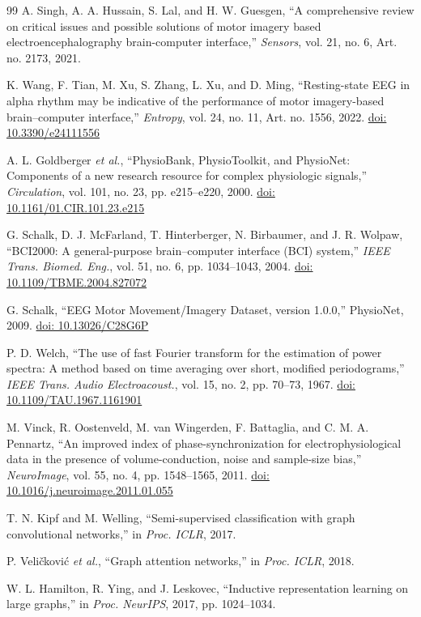 \documentclass{ieeeaccess}
\newcommand{\doiref}[1]{\href{https://doi.org/#1}{doi: #1}}
\begin{document}
\begin{thebibliography}{99}
 A. Singh, A. A. Hussain, S. Lal, and H. W. Guesgen, ``A comprehensive review on critical issues and possible solutions of motor imagery based electroencephalography brain-computer interface,'' \emph{Sensors}, vol. 21, no. 6, Art. no. 2173, 2021.

 K. Wang, F. Tian, M. Xu, S. Zhang, L. Xu, and D. Ming, ``Resting-state EEG in alpha rhythm may be indicative of the performance of motor imagery-based brain--computer interface,'' \emph{Entropy}, vol. 24, no. 11, Art. no. 1556, 2022. \doiref{10.3390/e24111556}

 A. L. Goldberger \textit{et al.}, ``PhysioBank, PhysioToolkit, and PhysioNet: Components of a new research resource for complex physiologic signals,'' \emph{Circulation}, vol. 101, no. 23, pp. e215--e220, 2000. \doiref{10.1161/01.CIR.101.23.e215}

 G. Schalk, D. J. McFarland, T. Hinterberger, N. Birbaumer, and J. R. Wolpaw, ``BCI2000: A general-purpose brain--computer interface (BCI) system,'' \emph{IEEE Trans. Biomed. Eng.}, vol. 51, no. 6, pp. 1034--1043, 2004. \doiref{10.1109/TBME.2004.827072}

 G. Schalk, ``EEG Motor Movement/Imagery Dataset, version 1.0.0,'' PhysioNet, 2009. \doiref{10.13026/C28G6P}

 P. D. Welch, ``The use of fast Fourier transform for the estimation of power spectra: A method based on time averaging over short, modified periodograms,'' \emph{IEEE Trans. Audio Electroacoust.}, vol. 15, no. 2, pp. 70--73, 1967. \doiref{10.1109/TAU.1967.1161901}

 M. Vinck, R. Oostenveld, M. van Wingerden, F. Battaglia, and C. M. A. Pennartz, ``An improved index of phase-synchronization for electrophysiological data in the presence of volume-conduction, noise and sample-size bias,'' \emph{NeuroImage}, vol. 55, no. 4, pp. 1548--1565, 2011. \doiref{10.1016/j.neuroimage.2011.01.055}

 T. N. Kipf and M. Welling, ``Semi-supervised classification with graph convolutional networks,'' in \emph{Proc. ICLR}, 2017.

 P. Veličković \textit{et al.}, ``Graph attention networks,'' in \emph{Proc. ICLR}, 2018.

 W. L. Hamilton, R. Ying, and J. Leskovec, ``Inductive representation learning on large graphs,'' in \emph{Proc. NeurIPS}, 2017, pp. 1024--1034.


\end{thebibliography}
\end{document}
